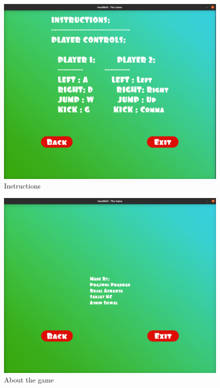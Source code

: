 \documentclass[main]{subfiles}
\begin{document}
\begin{figure}[H]
    \centering
    \includegraphics[scale=0.25]{graphics/state_screenshots/instructions_state}
    \caption{Instructions}
    \label{fig:instruction_state}
\end{figure}

\begin{figure}[H]
    \centering
    \includegraphics[scale=0.25]{graphics/state_screenshots/about_state}
    \caption{About the game}
    \label{fig:about_state}
\end{figure}
\end{document}
